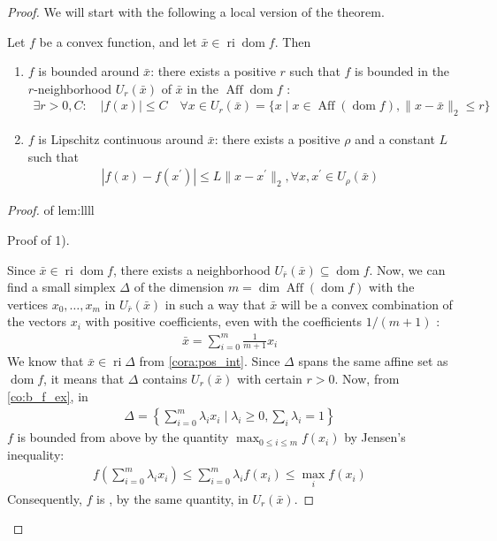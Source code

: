 \documentclass{article}
\newcommand{\ri}{\operatorname{ri}}
\newcommand{\Aff}{\operatorname{Aff}}
\newcommand{\dom}{\operatorname{dom}}
\begin{document}
\begin{proof}\color{ForestGreen}
We will start with the following a local version of the theorem.

\begin{lema}\label{lem:llll}
Let $f$ be a convex function, and let $\bar{x} \in \ri \dom f$. Then
\begin{enumerate}[1).]
    \item $f$ is bounded around $\bar{x}$: there exists a positive $r$ such that $f$ is bounded in the $r$-neighborhood $U_{r}(\bar{x})$ of $\bar{x}$ in the $\Aff \dom f$ :
\begin{align*}
\exists r>0, C: \quad|f(x)| \leq C \quad \forall x \in U_{r}(\bar{x})=\{x \mid x \in \operatorname{Aff}(\dom f),\| x-\bar{x} \|_2 \leq r\}
\end{align*}
\item $f$ is Lipschitz continuous around $\bar{x}$: there exists a positive $\rho$ and a constant $L$ such that
\begin{align*}
\left|f(x)-f\left(x^{\prime}\right)\right| \leq L\|x-x^{\prime}\|_2, \forall x, x^{\prime} \in U_{\rho}(\bar{x})
\end{align*}
\end{enumerate}
\end{lema} 
\begin{proof}\color{ForestGreen} of {lem:llll}

Proof of 1).

Since $\bar{x}\in \ri \dom f$, there exists a neighborhood $U_{\bar{r}}(\bar{x})\subseteq\dom f$. Now, we can find a small simplex $\Delta$ of the dimension $m=\operatorname{dim}\Aff(\dom  f)$ with the vertices $x_{0}, \ldots, x_{m}$ in $U_{\bar{r}}(\bar{x})$ in such a way that $\bar{x}$ will be a convex combination of the vectors $x_{i}$ with positive coefficients, even with the coefficients $1 /(m+1)$ :
\begin{align*}
\bar{x}=\sum_{i=0}^{m} \frac{1}{m+1} x_{i}
\end{align*}
We know that $\bar{x}\in \ri \Delta$ from \cref{cora:pos_int}. Since $\Delta$ spans the same affine set as $\dom  f$, it means that $\Delta$ contains $U_{r}(\bar{x})$ with certain $r>0$. Now, from \cref{co:b_f_ex}, in
\begin{align*}
\Delta=\left\{\sum_{i=0}^{m} \lambda_{i} x_{i} \mid \lambda_{i} \geq 0, \sum_{i} \lambda_{i}=1\right\}
\end{align*}
$f$ is bounded from above by the quantity $\max _{0 \leq i \leq m} f\left(x_{i}\right)$ by Jensen's inequality:
\begin{align*}
f\left(\sum_{i=0}^{m} \lambda_{i} x_{i}\right) \leq \sum_{i=0}^{m} \lambda_{i} f\left(x_{i}\right) \leq \max _{i} f\left(x_{i}\right)
\end{align*}
Consequently, $f$ is , by the same quantity, in $U_{r}(\bar{x})$.



\end{proof}
\end{proof}
\end{document}

